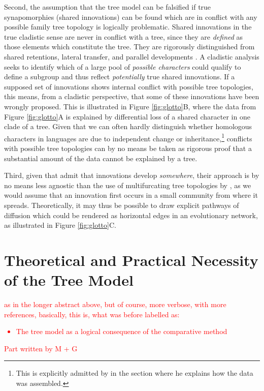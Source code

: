 \documentclass[svgnames,12pt]{scrartcl}
\newcommand\Comment[1]{\textcolor{red}{#1}}
\begin{document}
{{Second, the assumption that the tree
model can be falsified if true synapomorphies (shared innovations) can be found which are in
conflict with any possible family tree topology is logically problematic.
Shared innovations in the true cladistic sense are
never in conflict with a tree, since they are \emph{defined} as those elements which constitute the
tree. They are rigorously distinguished from shared retentions, lateral transfer, and
parallel developments \citep{Fleischhauer2009}. A cladistic analysis seeks to identify which
of a large pool of \emph{possible characters} could qualify to define a subgroup and thus reflect
\emph{potentially} true shared innovations. If a supposed set of innovations shows internal conflict
with possible tree topologies, this means, from a cladistic perspective, that some of these
innovations have been wrongly proposed. This is illustrated in Figure \ref{fig:glotto}B, where the data from Figure
\ref{fig:glotto}A is explained by differential loss of a shared character in one clade of a tree. Given
that we can often hardly distinguish whether homologous characters in languages are due to independent
change or inheritance,\footnote{This is explicitly admitted by \citet{Francois2015} in the section
where he explains how the data was assembled.} conflicts with possible tree topologies
can by no means be taken as rigorous proof that a substantial
amount of the data cannot
be explained by a tree. 
 
Third, given that \citet{Kalyan2016} admit that innovations develop
\emph{somewhere}, their approach is by no means less agnostic than the use of multifurcating tree
topologies by \citet{Ross1988}, as we would assume that an innovation first occurs in a small
community from where it spreads. Theoretically, it may thus be possible to draw explicit pathways of
diffusion which could be rendered as horizontal edges in an evolutionary network, as illustrated in
Figure \ref{fig:glotto}C.
 

\section{Theoretical and Practical Necessity of the Tree Model}
\Comment{as in the longer abstract above, but of course, more verbose, with more references,
basically, this is, what was before labelled as:
\begin{itemize}
    \item The tree model as a logical consequence of the comparative method
\end{itemize}
Part written by M + G}
}}
\end{document}
